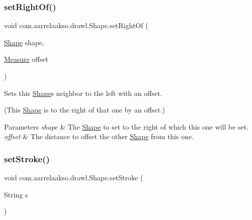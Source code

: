 \subsubsection{\texorpdfstring{set\+Right\+Of()}{setRightOf()}\hspace{0.1cm}{\footnotesize\ttfamily [2/2]}}
{\footnotesize\ttfamily void com.\+aarrelaakso.\+drawl.\+Shape.\+set\+Right\+Of (\begin{DoxyParamCaption}\item[{\hyperlink{classcom_1_1aarrelaakso_1_1drawl_1_1_shape}{Shape}}]{shape,  }\item[{\hyperlink{classcom_1_1aarrelaakso_1_1drawl_1_1_measure}{Measure}}]{offset }\end{DoxyParamCaption})\hspace{0.3cm}{\ttfamily [inherited]}}



Sets this \hyperlink{classcom_1_1aarrelaakso_1_1drawl_1_1_shape}{Shape}\textquotesingle{}s neighbor to the left with an offset. 

(This \hyperlink{classcom_1_1aarrelaakso_1_1drawl_1_1_shape}{Shape} is to the right of that one by an offset.)


\begin{DoxyParams}{Parameters}
{\em shape} & The \hyperlink{classcom_1_1aarrelaakso_1_1drawl_1_1_shape}{Shape} to set to the right of which this one will be set. \\
\hline
{\em offset} & The distance to offset the other \hyperlink{classcom_1_1aarrelaakso_1_1drawl_1_1_shape}{Shape} from this one. \\
\hline
\end{DoxyParams}
\mbox{\label{classcom_1_1aarrelaakso_1_1drawl_1_1_shape_a3930f6fe72f6c5e0c0aa4c25ffbf18ff}} 
\subsubsection{\texorpdfstring{set\+Stroke()}{setStroke()}}
{\footnotesize\ttfamily void com.\+aarrelaakso.\+drawl.\+Shape.\+set\+Stroke (\begin{DoxyParamCaption}\item[{String}]{s }\end{DoxyParamCaption})\hspace{0.3cm}{\ttfamily [inherited]}}



